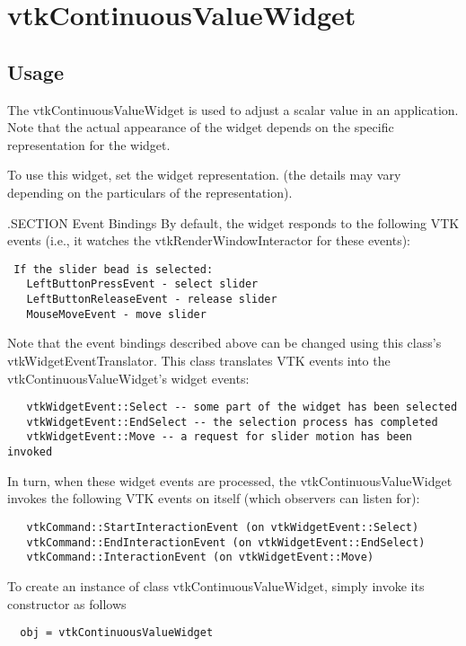 \section{vtkContinuousValueWidget}

\subsection{Usage}

 The vtkContinuousValueWidget is used to adjust a scalar value in an 
 application. Note that the actual appearance of the widget depends on
 the specific representation for the widget.
 
 To use this widget, set the widget representation. (the details may
 vary depending on the particulars of the representation). 


 .SECTION Event Bindings
 By default, the widget responds to the following VTK events (i.e., it
 watches the vtkRenderWindowInteractor for these events):
 \begin{verbatim}
 If the slider bead is selected:
   LeftButtonPressEvent - select slider 
   LeftButtonReleaseEvent - release slider 
   MouseMoveEvent - move slider
 \end{verbatim}

 Note that the event bindings described above can be changed using this
 class's vtkWidgetEventTranslator. This class translates VTK events 
 into the vtkContinuousValueWidget's widget events:
 \begin{verbatim}
   vtkWidgetEvent::Select -- some part of the widget has been selected
   vtkWidgetEvent::EndSelect -- the selection process has completed
   vtkWidgetEvent::Move -- a request for slider motion has been invoked
 \end{verbatim}

 In turn, when these widget events are processed, the vtkContinuousValueWidget
 invokes the following VTK events on itself (which observers can listen for):
 \begin{verbatim}
   vtkCommand::StartInteractionEvent (on vtkWidgetEvent::Select)
   vtkCommand::EndInteractionEvent (on vtkWidgetEvent::EndSelect)
   vtkCommand::InteractionEvent (on vtkWidgetEvent::Move)
 \end{verbatim}


To create an instance of class vtkContinuousValueWidget, simply
invoke its constructor as follows
\begin{verbatim}
  obj = vtkContinuousValueWidget
\end{verbatim}
